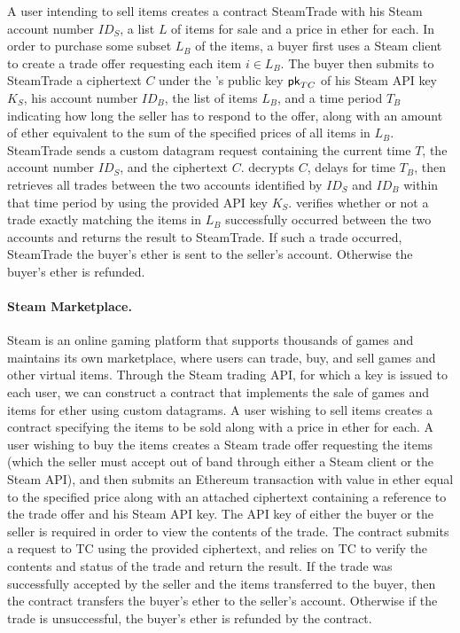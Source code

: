 A user intending to sell items creates a contract {\sf SteamTrade} with his Steam account number $ID_S$, a list $L$ of items for sale and a price in ether for each.  In order to purchase some subset $L_B$ of the items, a buyer first uses a Steam client to create a trade offer requesting each item $i \in L_B$.  The buyer then submits to {\sf SteamTrade} a ciphertext $C$ under the \tc's public key ${\sf pk}_{TC}$ of his Steam API key $K_S$, his account number $ID_B$, the list of items $L_B$, and a time period $T_B$ indicating how long the seller has to respond to the offer, along with an amount of ether equivalent to the sum of the specified prices of all items in $L_B$.  {\sf SteamTrade} sends \tc a custom datagram request containing the current time $T$, the account number $ID_S$, and the ciphertext $C$.  \tc decrypts $C$, delays for time $T_B$, then retrieves all trades between the two accounts identified by $ID_S$ and $ID_B$ within that time period by using the provided API key $K_S$.  \tc verifies whether or not a trade exactly matching the items in $L_B$ successfully occurred between the two accounts and returns the result to {\sf SteamTrade}.  If such a trade occurred, {\sf SteamTrade} the buyer's ether is sent to the seller's account.  Otherwise the buyer's ether is refunded.


\iffalse
\paragraph{Steam Marketplace.} Steam  is an online gaming platform that supports thousands of games and maintains its own marketplace, where users can trade, buy, and sell games and other virtual items.  Through the Steam trading API, for which a key is issued to each user, we can construct a contract that implements the sale of games and items for ether using custom datagrams.  A user wishing to sell items creates a contract specifying the items to be sold along with a price in ether for each.  A user wishing to buy the items creates a Steam trade offer requesting the items (which the seller must accept out of band through either a Steam client or the Steam API), and then submits an Ethereum transaction with value in ether equal to the specified price along with an attached ciphertext containing a reference to the trade offer and his Steam API key.  The API key of either the buyer or the seller is required in order to view the contents of the trade.  The contract submits a request to TC using the provided ciphertext, and relies on TC to verify the contents and status of the trade and return the result.  If the trade was successfully accepted by the seller and the items transferred to the buyer, then the contract transfers the buyer's ether to the seller's account.  Otherwise if the trade is unsuccessful, the buyer's ether is refunded by the contract.

